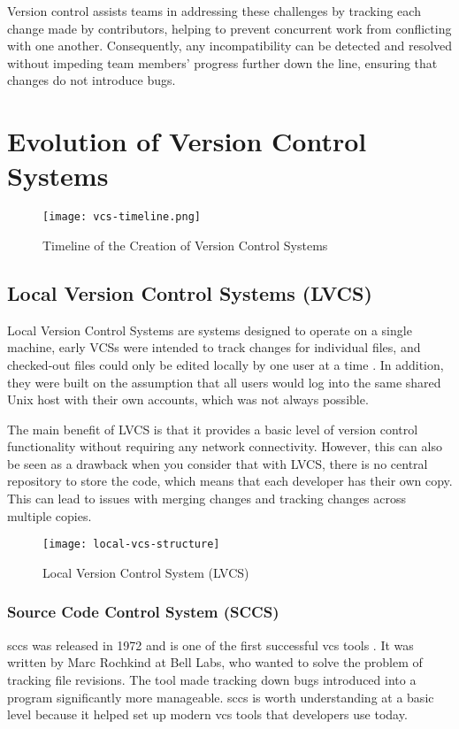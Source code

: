 Version control assists teams in addressing these challenges by tracking each change made by contributors, helping to prevent concurrent work from conflicting with one another. Consequently, any incompatibility can be detected and resolved without impeding team members' progress further down the line, ensuring that changes do not introduce bugs.

\section{Evolution of Version Control Systems}
\begin{figure}[htbp]
    \centering
    \texttt{[image: vcs-timeline.png]}
    \caption{Timeline of the Creation of Version Control Systems \cite{stopak_2019}}
    \label{fig:vcs-timeline}
\end{figure}
\subsection{Local Version Control Systems (LVCS)}
Local Version Control Systems are systems designed to operate on a single machine, early VCSs were intended to track changes for individual files, and checked-out files could only be edited locally by one user at a time \cite{stopak_2019}. In addition, they were built on the assumption that all users would log into the same shared Unix host with their own accounts, which was not always possible.
\smallskip

The main benefit of LVCS is that it provides a basic level of version control functionality without requiring any network connectivity. However, this can also be seen as a drawback when you consider that with LVCS, there is no central repository to store the code, which means that each developer has their own copy. This can lead to issues with merging changes and tracking changes across multiple copies.

\begin{figure}[htbp]
    \centering
    \texttt{[image: local-vcs-structure]}
    \caption{Local Version Control System (LVCS)}
    \label{fig:lvcs-structure}
\end{figure}

\subsubsection{Source Code Control System (SCCS)}
\label{sec:sccs}
\acrlong{sccs} was released in 1972 and is one of the first successful \acrshort{vcs} tools \cite{stopak_2019}. It was written by Marc Rochkind at Bell Labs, who wanted to solve the problem of tracking file revisions. The tool made tracking down bugs introduced into a program significantly more manageable. \acrshort{sccs} is worth understanding at a basic level because it helped set up modern \acrshort{vcs} tools that developers use today.
